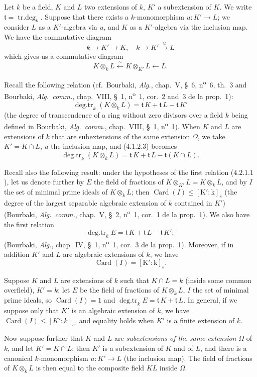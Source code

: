 \begin{env}[4.1.2]
\label{IV.4.1.2}
Let $k$ be a field, $K$ and $L$ two extensions of $k$, $K'$ a subextension of $K$.
We write $\mathfrak{t}=\operatorname{tr.deg}_k$.
Suppose that there exists a $k$-monomorphism $u:K'\to L$; we consider $L$ as a $K'$-algebra via $u$, and $K$ as a $K'$-algebra via the inclusion map.
We have the commutative diagram
\[
\tag{4.1.2.1}
k\to K'\to K, \quad k\to K'\xrightarrow{u} L
\]
which gives us a commutative diagram
\[
\tag{4.1.2.2}
K\otimes_k L \xleftarrow{\sim} K\otimes_{K'}L \xleftarrow{} L.
\]

Recall the following relation (cf.\ Bourbaki, \emph{Alg.}, chap.~V, \S~6, n\textsuperscript{o}~6, th.~3 and Bourbaki, \emph{Alg.~comm.}, chap.~VIII, \S~1, n\textsuperscript{o}~1, cor.~2 and~3 de la prop.~1):
\[
\tag{4.1.2.3}
\operatorname{deg.tr}_k(K\otimes_k L) = \mathfrak{t}\,K + \mathfrak{t}\,L - \mathfrak{t}\,K'
\]
(the degree of transcendence of a ring without zero divisors over a field $k$ being defined in Bourbaki, \emph{Alg.~comm.}, chap.~VIII, \S~1, n\textsuperscript{o}~1).
When $K$ and $L$ are extensions of $k$ that are subextensions of the same extension $\Omega$, we take $K'=K\cap L$, $u$ the inclusion map, and ($4.1.2.3$) becomes
\[
\tag{4.1.2.4}
\operatorname{deg.tr}_k(K\otimes_k L) = \mathfrak{t}\,K + \mathfrak{t}\,L - \mathfrak{t}(K\cap L).
\]

Recall also the following result: under the hypotheses of the first relation ($4.2.1.1$), let us denote further by $E$ the field of fractions of $K\otimes_{K'} L = K\otimes_k L$, and by $I$ the set of minimal prime ideals of $K\otimes_k L$; then $\operatorname{Card}(I)\leq[\mathrm{K}':\mathrm{k}]_s$ (the degree of the largest separable algebraic extension of $k$ contained in $K'$) (Bourbaki, \emph{Alg.~comm.}, chap.~V, \S~2, n\textsuperscript{o}~1, cor.~1 de la prop.~1).
We also have the first relation
\[
\tag{4.2.1.1}
\operatorname{deg.tr}_k E = \mathfrak{t}\,K + \mathfrak{t}\,L - \mathfrak{t}\,K';
\]
(Bourbaki, \emph{Alg.}, chap.~IV, \S~1, n\textsuperscript{o}~1, cor.~3 de la prop.~1).
Moreover, if in addition $K'$ and $L$ are algebraic extensions of $k$, we have
\[
\operatorname{Card}(I) = [\mathrm{K}' : \mathrm{k}]_s.
\]

Suppose $K$ and $L$ are extensions of $k$ such that $K\cap L=k$ (inside some common overfield), $K'=k$; let $E$ be the field of fractions of $K\otimes_k L$, $I$ the set of minimal prime ideals, so $\operatorname{Card}(I)=1$ and $\operatorname{deg.tr}_k E = \mathfrak{t}\,K + \mathfrak{t}\,L$.
In general, if we suppose only that $K'$ is an algebraic extension of $k$, we have $\operatorname{Card}(I)\leq [K':k]_s$, and equality holds when $K'$ is a finite extension of $k$.

Now suppose further that $K$ and $L$ are \emph{subextensions of the same extension} $\Omega$ of $k$, and let $K'=K\cap L$; then $K'$ is a subextension of $K$ and of $L$, and there is a canonical $k$-monomorphism $u:K'\to L$ (the inclusion map).
The field of fractions of $K\otimes_k L$ is then equal to the composite field $KL$ inside $\Omega$.
\end{env}

